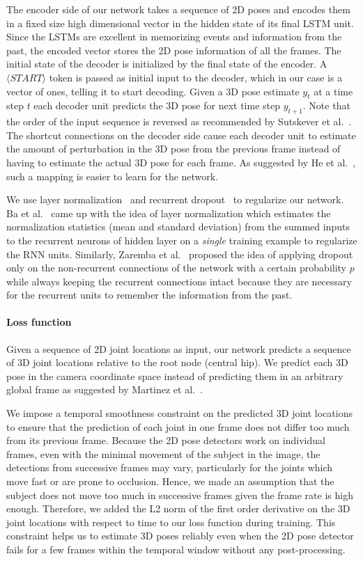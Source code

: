 \documentclass[runningheads]{llncs}
\begin{document}
The encoder side of our network takes a sequence of 2D poses and encodes them in a fixed size high dimensional vector in the hidden state of its final LSTM unit. Since the LSTMs are excellent in memorizing events and information from the past, the encoded vector stores the 2D pose information of all the frames. The initial state of the decoder is initialized by the final state of the encoder. A $\langle START \rangle$ token is passed as initial input to the decoder, which in our case is a vector of ones, telling it to start decoding. Given a 3D pose estimate $y_t$ at a time step $t$ each decoder unit predicts the 3D pose for next time step $y_{t+1}$. Note that the order of the input sequence is reversed as recommended by Sutskever et al.~\cite{sutskever2014sequence}. The shortcut connections on the decoder side cause each decoder unit to estimate the amount of perturbation in the 3D pose from the previous frame instead of having to estimate the actual 3D pose for each frame. As suggested by He et al.~\cite{he2016deep}, such a mapping is easier to learn for the network.

We use layer normalization~\cite{ba2016layer} and recurrent dropout~\cite{zaremba2014recurrent} to regularize our network. Ba et al.~\cite{ba2016layer} came up with the idea of layer normalization which estimates the normalization statistics (mean and standard deviation) from the summed inputs to the recurrent neurons of hidden layer on a \emph{single} training example to regularize the RNN units. Similarly, Zaremba et al.~\cite{zaremba2014recurrent} proposed the idea of applying dropout only on the non-recurrent connections of the network with a certain probability $p$ while always keeping the recurrent connections intact because they are necessary for the recurrent units to remember the information from the past.  
\vspace{-5mm}
\paragraph{Loss function}
Given a sequence of 2D joint locations as input, our network predicts a sequence of 3D joint locations relative to the root node (central hip). We predict each 3D pose in the camera coordinate space instead of predicting them in an arbitrary global frame as suggested by Martinez et al.~\cite{JMartinez:ICCV:2017}.

We impose a temporal smoothness constraint on the predicted 3D joint locations to ensure that the prediction of each joint in one frame does not differ too much from its previous frame. Because the 2D pose detectors work on individual frames, even with the minimal movement of the subject in the image, the detections from successive frames may vary, particularly for the joints which move fast or are prone to occlusion. Hence, we made an assumption that the subject does not move too much in successive frames given the frame rate is high enough. Therefore, we added the L2 norm of the first order derivative on the 3D joint locations with respect to time to our loss function during training. This constraint helps us to estimate 3D poses reliably even when the 2D pose detector fails for a few frames within the temporal window without any post-processing.
\end{document}
